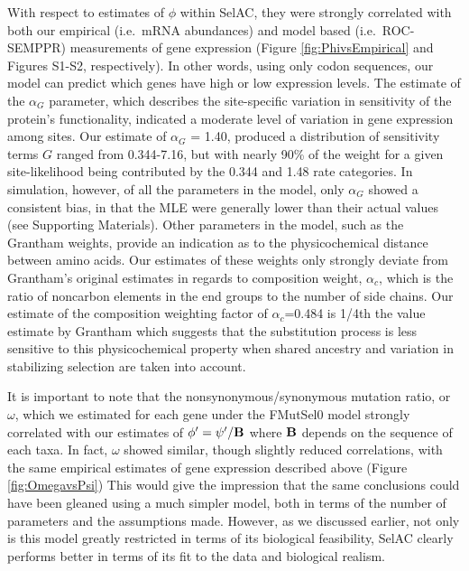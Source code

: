 \documentclass[12pt,letterpaper]{article}
\newcommand{\Func}{\ensuremath{\text{\textbf{B}}}\xspace}
\newcommand{\selac}{SelAC\xspace}
\newcommand{\alphac}{\ensuremath{\alpha_c}\xspace}
\newcommand{\alphag}{\ensuremath{\alpha_G}\xspace}
\newcommand{\phiprime}{\ensuremath{\phi^\prime}\xspace}
\newcommand{\psiprime}{\ensuremath{\psi^\prime}\xspace}
\begin{document}
With respect to estimates of $\phi$ within \selac, they were strongly correlated with both our empirical (i.e.~mRNA abundances) and model based (i.e.~ROC-SEMPPR) measurements of gene expression (Figure \ref{fig:PhivsEmpirical} and Figures S1-S2, respectively).
In other words, using only codon sequences, our model can predict which genes have high or low expression levels.
The estimate of the $\alphag$ parameter, which describes the site-specific variation in sensitivity of the protein's functionality, indicated a moderate level of variation in gene expression among sites.
Our estimate of $\alphag$ = 1.40, produced a distribution of sensitivity terms $G$ ranged from 0.344-7.16, but with nearly 90\% of the weight for a given site-likelihood being contributed by the 0.344 and 1.48 rate categories.
In simulation, however, of all the parameters in the model, only $\alphag$ showed a consistent bias, in that the MLE were generally lower than their actual values (see Supporting Materials).
Other parameters in the model, such as the Grantham weights, provide an indication as to the physicochemical distance between amino acids.
Our estimates of these weights only strongly deviate from Grantham's \citeyear{Grantham1974} original estimates in regards to composition weight, $\alphac$, which is the ratio of noncarbon elements in the end groups to the number of side chains.
Our estimate of the composition weighting factor of $\alphac$=0.484 is 1/4th the value estimate by Grantham which suggests that the substitution process is less sensitive to this physicochemical property when shared ancestry and variation in stabilizing selection are taken into account.

It is important to note that the nonsynonymous/synonymous mutation ratio, or $\omega$, which we estimated for each gene under the FMutSel0 model strongly correlated with our estimates of $\phiprime = \psiprime/\Func$ where $\Func$ depends on the sequence of each taxa.
In fact, $\omega$ showed similar, though slightly reduced correlations, with the same empirical estimates of gene expression described above (Figure \ref{fig:OmegavsPsi})
This would give the impression that the same conclusions could have been gleaned using a much simpler model, both in terms of the number of parameters and the assumptions made.
However, as we discussed earlier, not only is this model greatly restricted in terms of its biological feasibility, \selac clearly performs better in terms of its fit to the data and biological realism.
\end{document}
